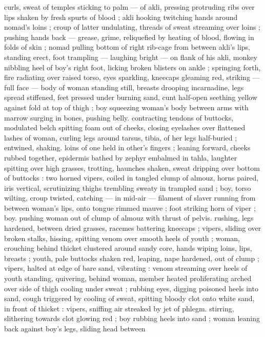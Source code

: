curls, sweat of temples sticking to palm --- of akli, pressing 
protruding ribs over lips shaken by fresh spurts of blood ; akli 
hooking twitching hands around nomad's loins ; croup of latter 
undulating, threads of sweat streaming over loins ; pushing hands 
back --- grease, grime, reliquefied by heating of blood, flowing in 
folds of skin ; nomad pulling bottom of right rib-cage from between 
akli's lips, standing erect, foot trampling --- laughing bright --- on 
flank of his akli, monkey nibbling heel of boy's right foot, licking 
broken blisters on ankle ; springing forth, fire radiating over raised 
torso, eyes sparkling, kneecaps gleaming red, striking --- full face 
--- body of woman standing still, breasts drooping incarnadine, legs 
spread stiffened, feet pressed under burning sand, cunt half-open 
seething yellow against fold at top of thigh ; boy squeezing woman's 
body between arms with marrow surging in bones, pushing belly. 
contracting tendons of buttocks, modulated belch spitting foam out 
of cheeks, closing eyelashes over flattened lashes of woman, curling 
legs around tarsus, tibia, of her legs half-buried ; entwined, shaking. 
loins of one held in other's fingers ; leaning forward, cheeks rubbed 
together, epidermis bathed by zephyr embalmed in tahla, laughter 
spitting over high grasses, trotting, haunches shaken, sweat dripping 
over bottom of buttocks : two horned vipers, coiled in tangled clump 
of almouz, horns paired, iris vertical, scrutinizing thighs trembling 
sweaty in trampled sand ; boy, torso wilting, croup twisted, catching 
--- in mid-air --- filament of slaver running from between woman's 
lips, onto tongue rimmed mauve ; foot striking horn of viper ; boy. 
pushing woman out of clump of almouz with thrust of pelvis. 
rushing, legs hardened, between dried grasses, racemes battering 
kneecaps ; vipers, sliding over broken stalks, hissing, spitting venom 
over smooth heels of youth ; woman, crouching behind thicket 
clustered around sandy core, hands wiping loins, lips, breasts ; 
youth, pale buttocks shaken red, leaping, nape hardened, out of 
clump ; vipers, halted at edge of bare sand, vibrating : venom 
streaming over heels of youth standing, quivering, behind woman, 
member heated proliferating arched over side of thigh cooling under 
sweat ; rubbing eyes, digging poisoned heels into sand, cough 
triggered by cooling of sweat, spitting bloody clot onto white sand, 
in front of thicket : vipers, sniffing air streaked by jet of phlegm. 
stirring, slithering towards clot glowing red ; boy rubbing heels into 
sand ; woman leaning back against boy's legs, sliding head between 
